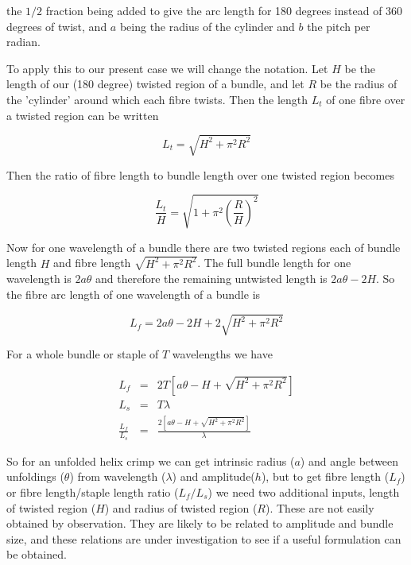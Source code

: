 \documentclass[titlepage,10pt]{article}  %
\begin{document}
the $1/2$ fraction being added to give the arc length for 180 degrees instead of 360 degrees of twist, and $a$ being the radius of the cylinder and $b$ the pitch per radian.

To apply this to our present case we will change the notation. Let $H$ be the length of our (180 degree) twisted region of a bundle, and let $R$ be the radius  of the 'cylinder' around which each fibre twists.
Then the length $L_{t}$ of one fibre over a twisted region can be written

\begin{equation}
\label{eqn:twistlen}
L_{t} = \sqrt{H^{2} + \pi^{2} R^{2}}
\end{equation}

Then the ratio of fibre length to bundle length over one twisted region becomes

\begin{equation}
\label{eqn:twistrat}
\frac{L_{t}}{H} =  \sqrt{1 + \pi^{2} \left(\frac{R}{H}\right)^{2} }
\end{equation}


Now for one wavelength  of a bundle there are two twisted regions each of bundle length $H$  and fibre length $ \sqrt{H^{2} + \pi^{2} R^{2}}$. The full bundle length for one wavelength is $2 a \theta$ and therefore the remaining untwisted length is $2 a \theta - 2H$. So the fibre arc length of one wavelength of a bundle is 

\begin{equation}
\label{eqn:wavlfiblen}
L_{f} =  2 a \theta - 2H +  2 \sqrt{H^{2} + \pi^{2} R^{2}}
\end{equation}

For a whole bundle or staple of $T$ wavelengths we have

\begin{eqnarray}
\label{eqn:lf}
L_{f} & = &  2 T \left[ a \theta - H +   \sqrt{H^{2} + \pi^{2} R^{2}}\right]  \\
L_{s} & = &  T \lambda \\
\label{eqn:lfls}
\frac{L_{f}}{L_{s}} & = & \frac{2 \left[ a \theta - H +   \sqrt{H^{2} + \pi^{2} R^{2}}\right] }{\lambda}
\end{eqnarray}

So for an unfolded helix crimp we can get intrinsic radius ($a$) and angle between unfoldings ($\theta$) from wavelength ($\lambda$) and amplitude($h$), but to get fibre length ($L_{f}$) or fibre length/staple length ratio ($L_{f}/L_{s}$) we need two additional inputs, length of twisted region ($H$) and radius of twisted region ($R$). These are not easily obtained by observation. They are likely to be related to amplitude and bundle size, and these relations are under investigation to see if a useful formulation can be obtained.
\end{document}
